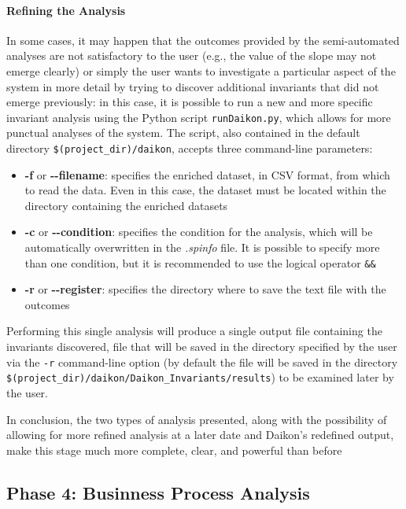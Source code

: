 \paragraph{Refining the Analysis}
In some cases, it may happen that the outcomes provided by the semi-automated analyses are not satisfactory to the user (e.g., the value of the slope may not emerge clearly) or simply the user wants to investigate a particular aspect of the system in more detail by trying to discover additional invariants that did not emerge previously: in this case, it is possible to run a new and more specific invariant analysis using the Python script \texttt{runDaikon.py}, which allows for more punctual analyses of the system.\newline
The script, also contained in the default directory \texttt{\$(project\_dir)/daikon}, accepts three command-line parameters:

\begin{itemize}
	\item \textbf{-f} or \textbf{{-}{-}filename}: specifies the enriched dataset, in CSV format, from which to read the data. Even in this case, the dataset must be located within the directory containing the enriched datasets
	\item \textbf{-c} or \textbf{{-}{-}condition}: specifies the condition for the analysis, which will be automatically overwritten in the \textit{.spinfo} file. It is possible to specify more than one condition, but it is recommended to use the logical operator \texttt{\&\&}
	\item \textbf{-r} or \textbf{{-}{-}register}: specifies the directory where to save the text file with the outcomes
\end{itemize}
Performing this single analysis will produce a single output file containing the invariants discovered, file that will be saved in the directory specified by the user via the \texttt{-r} command-line option (by default the file will be saved in the directory \texttt{\$(project\_dir)/daikon/Daikon\_Invariants/results}) to be examined later by the user.

\bigskip
In conclusion, the two types of analysis presented, along with the possibility of allowing for more refined analysis at a later date and Daikon's redefined output, make this stage much more complete, clear, and powerful than before

\subsection{Phase 4: Businness Process Analysis}
\label{subsec:4_improve_bpa}

\vfill
\nolinenumbers